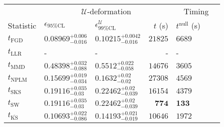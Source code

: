 \begin{tabular}{l|llr|llr}
	\toprule
	\multicolumn{1}{c}{} & \multicolumn{3}{c}{$\mathcal{U}$-deformation} & \multicolumn{3}{c}{Timing} \\
	Statistic & $\epsilon_{95\%\mathrm{CL}}$ & $\epsilon^    {\mathcal{U}}_{99\%\mathrm{CL}}$ & $t$ (s) & $t^{\mathrm{null}}$ (s) \\
	\midrule
	$t_{\mathrm{FGD}}$ & ${\mathbf{0.08969_{-0.016}^{+0.006}}}$ & ${\mathbf{0.10215_{-0.016}^{+0.0042}}}$ & $21825$ & $6689$ \\
	$t_{\mathrm{LLR}}$ & - & - & - & - \\
	$t_{\mathrm{MMD}}$ & $0.48398_{-0.088}^{+0.032}$ & $0.5512_{-0.058}^{+0.022}$ & $14676$ & $3605$ \\
\rowcolor{red!35}	$t_{\mathrm{NPLM}}$ & $0.15699_{-0.034}^{+0.019}$ & $0.1632_{-0.02}^{+0.02}$ & $27308$ & $4569$ \\
	$t_{\mathrm{SKS}}$ & $0.19116_{-0.03}^{+0.035}$ & $0.22462_{-0.039}^{+0.02}$ & $16154$ & $4379$ \\
	$t_{\mathrm{SW}}$ & $0.19116_{-0.03}^{+0.035}$ & $0.22462_{-0.039}^{+0.02}$ & ${\mathbf{774}}$ & ${\mathbf{133}}$ \\
	$t_{\overline{\mathrm{KS}}}$ & $0.10693_{-0.086}^{+0.022}$ & $0.14193_{-0.019}^{+0.021}$ & $10646$ & $1972$ \\
	\bottomrule
\end{tabular}
